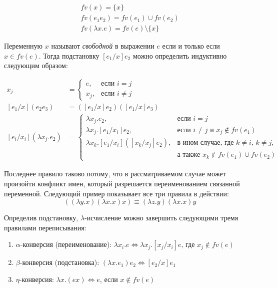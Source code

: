 \begin{gather*}
fv(x) = \{x\} \\
fv(e_1 e_2) = fv(e_1) \cup fv(e_2) \\
fv(\lambda x.e) = fv(e) \setminus \{x\}
\end{gather*}

Переменную $x$ называют \emph{свободной} в выражении $e$ если и только если $x \in fv(e)$. Тогда подстановку $[e_1/x]e_2$ можно определить индуктивно следующим образом:

\begin{align*}
[e/x_i]x_j &= \begin{cases}
  e,& \text{если $i=j$} \\
  x_j,& \text{если $i \neq j$}
\end{cases} \\
[e_1/x](e_2 e_3) &= ([e_1/x]e_2)([e_1/x]e_3) \\
[e_i/x_i](\lambda x_j.e_2) &= \begin{cases}
  \lambda x_j.e_2,& \text{если $i = j$} \\
  \lambda x_j.[e_1/x_i]e_2,& \text{если $i \neq j$ и $x_j \notin fv(e_1)$} \\
  \lambda x_k.[e_1/x_i]([x_k/x_j]e_2),& \text{в ином случае, где $k \neq i$, $k \neq j$,} \\
  & \text{а также $x_k \notin fv(e_1) \cup fv(e_2)$}
\end{cases}
\end{align*}

Последнее правило таково потому, что в рассматриваемом случае может произойти конфликт имен, который разрешается переименованием связанной переменной. Следующий пример показывает все три правила в действии:
\begin{equation*}
[y/x]((\lambda y.x) (\lambda x.x) x) \equiv (\lambda z. y) (\lambda x.x) y
\end{equation*}

Определив подстановку, $\lambda$-исчисление можно завершить следующими тремя правилами переписывания:

\begin{enumerate}
\item $\alpha$-конверсия (переименование): $\lambda x_i.e \Leftrightarrow \lambda x_j.[x_j/x_i]e$, где $x_j \notin fv(e)$
\item $\beta$-конверсия (подстановка): $(\lambda x.e_1)e_2 \Leftrightarrow [e_2/x]e_1$
\item $\eta$-конверсия: $\lambda x.(e x) \Leftrightarrow e$, если $x \notin fv(e)$
\end{enumerate}

